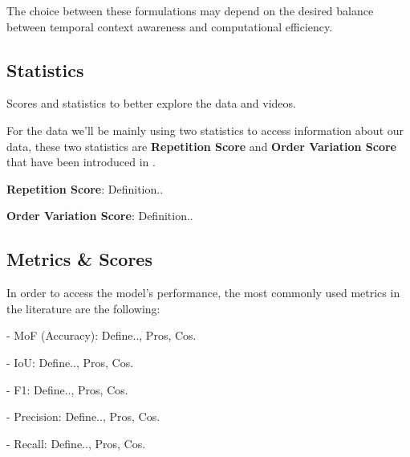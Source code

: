 The choice between these formulations may depend on the desired balance between temporal context awareness and computational efficiency.


\subsection{Statistics}

Scores and statistics to better explore the data and videos.

For the data we'll be mainly using two statistics to access information about our data, these two statistics are \textbf{Repetition Score} and \textbf{Order Variation Score} that have been introduced in \cite{tas-survey}.

\textbf{Repetition Score}: Definition..

\textbf{Order Variation Score}: Definition..

\subsection{Metrics \& Scores}

In order to access the model's performance, the most commonly used metrics in the literature are the following:

- MoF (Accuracy): Define.., Pros, Cos.

- IoU: Define.., Pros, Cos.

- F1: Define.., Pros, Cos.

- Precision: Define.., Pros, Cos.

- Recall: Define.., Pros, Cos.